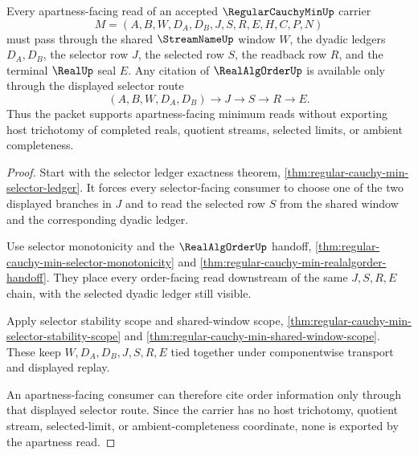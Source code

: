 \begin{theorem}
\label{thm:regular-cauchy-min-apartness-selector-scope}
Every apartness-facing read of an accepted $\RegularCauchyMinUp$ carrier
$$
M=(A,B,W,D_A,D_B,J,S,R,E,H,C,P,N)
$$
must pass through the shared $\StreamNameUp$ window $W$, the dyadic ledgers $D_A,D_B$, the selector row $J$, the selected row $S$, the readback row $R$, and the terminal $\RealUp$ seal $E$. Any citation of $\RealAlgOrderUp$ is available only through the displayed selector route
$$
(A,B,W,D_A,D_B)
\longrightarrow
J
\longrightarrow
S
\longrightarrow
R
\longrightarrow
E .
$$
Thus the packet supports apartness-facing minimum reads without exporting host trichotomy of completed reals, quotient streams, selected limits, or ambient completeness.
\end{theorem}
\begin{proof}
Start with the selector ledger exactness theorem, \autoref{thm:regular-cauchy-min-selector-ledger}. It forces every selector-facing consumer to choose one of the two displayed branches in $J$ and to read the selected row $S$ from the shared window and the corresponding dyadic ledger.

Use selector monotonicity and the $\RealAlgOrderUp$ handoff, \autoref{thm:regular-cauchy-min-selector-monotonicity} and \autoref{thm:regular-cauchy-min-realalgorder-handoff}. They place every order-facing read downstream of the same $J,S,R,E$ chain, with the selected dyadic ledger still visible.

Apply selector stability scope and shared-window scope, \autoref{thm:regular-cauchy-min-selector-stability-scope} and \autoref{thm:regular-cauchy-min-shared-window-scope}. These keep $W,D_A,D_B,J,S,R,E$ tied together under componentwise transport and displayed replay.

An apartness-facing consumer can therefore cite order information only through that displayed selector route. Since the carrier has no host trichotomy, quotient stream, selected-limit, or ambient-completeness coordinate, none is exported by the apartness read.
\end{proof}

